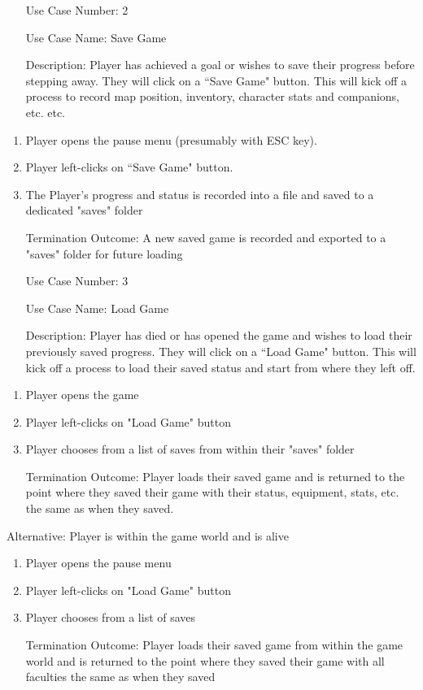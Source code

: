 \documentclass[10pt,conference,onecolumn,compsoc]{IEEEtran}
\begin{document}
\begin{itemize}
\item[Use Case Number:] 2
\item[Use Case Name:] Save Game
\item[Description:] Player has achieved a goal or wishes to save their progress before stepping away.  They will click on a ``Save Game" button.  This will kick off a process to record map position, inventory, character stats and companions, etc. etc.
\end{itemize}

\begin{enumerate}
\item Player opens the pause menu (presumably with ESC key).
\item Player left-clicks on ``Save Game" button.
\item The Player's progress and status is recorded into a file and saved to a dedicated "saves" folder
\item [Termination Outcome:] A new saved game is recorded and exported to a "saves" folder for future loading
\end{enumerate}

\begin{itemize}
\item[Use Case Number:] 3
\item[Use Case Name:] Load Game
\item[Description:] Player has died or has opened the game and wishes to load their previously saved progress. They will click on a ``Load Game" button. This will kick off a process to load their saved status and start from where they left off.
\end{itemize}

\begin{enumerate}
\item Player opens the game
\item Player left-clicks on "Load Game" button
\item Player chooses from a list of saves from within their "saves" folder
\item [Termination Outcome:] Player loads their saved game and is returned to the point where they saved their game with their status, equipment, stats, etc. the same as when they saved.
\end{enumerate}

Alternative: Player is within the game world and is alive
\begin{enumerate}
\item Player opens the pause menu
\item Player left-clicks on "Load Game" button
\item Player chooses from a list of saves
\item [Termination Outcome:] Player loads their saved game from within the game world and is returned to the point where they saved their game with all faculties the same as when they saved
\end{enumerate}
\end{document}

